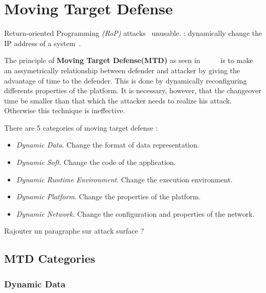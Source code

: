 \newpage

\section {Moving Target Defense}


{\Huge R}eturn-oriented Programming \emph{(RoP)} attacks~\cite{hund_return-oriented_nodate} unusable\cite{lei_moving_2018, cai_moving_2016, lei_moving_2018, xu_2014}. 
\cite{lei_moving_2018,okhravi_survey_2013, okhravi_finding_2014, lei_moving_2018}:
\cite{noauthor_karl_nodate}
dynamically change the IP address of a system~\cite{ayrault_run_2019}.


The principle of \textbf{Moving Target Defense(MTD)} as seen in
~\cite{okhravi_2014} ~\cite{survey_cyber} ~\cite{lei_moving_2018} is to make an
assymetrically relationship between defender and attacker by
giving the advantage of time to the defender. This is done by
dynamically reconfiguring differents properties of the
platform. \newline
It is necessary, however, that the changeover time be
smaller than that which the attacker needs to realize his
attack. Otherwise this technique is ineffective.

There are 5 categories of moving target defense :

\begin{itemize}

\item \emph{Dynamic Data}. Change the format of data representation.
\item \emph{Dynamic Soft}. Change the code of the application.
\item \emph{Dynamic Runtime Environment}. Change the execution environment.
\item \emph{Dynamic Platform}. Change the properties of the platform.
\item \emph{Dynamic Network}. Change the configuration and properties of the network.
\end{itemize}

Rajouter un paragraphe sur attack surface ?

\subsection{MTD Categories}

\subsubsection{Dynamic Data}

